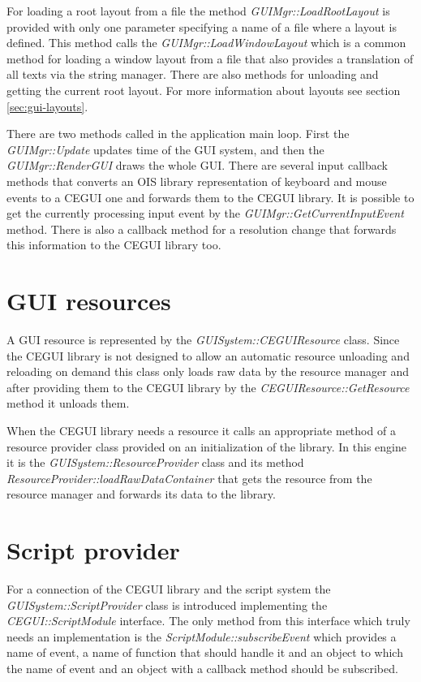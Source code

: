 \documentclass[a4paper, 12pt]{report}
\begin{document}
For loading a root layout from a file the method \emph{GUIMgr::LoadRootLayout} is provided with only one parameter specifying a name of a file where a layout is defined. This method calls the \emph{GUIMgr::LoadWindowLayout} which is a common method for loading a window layout from a file that also provides a translation of all texts via the string manager. There are also methods for unloading and getting the current root layout. For more information about layouts see section \ref{sec:gui-layouts}.

There are two methods called in the application main loop. First the \emph{GUIMgr::Update} updates time of the GUI system, and then the \emph{GUIMgr::Render\-GUI} draws the whole GUI. There are several input callback methods that converts an OIS library representation of keyboard and mouse events to a CEGUI one and forwards them to the CEGUI library. It is possible to get the currently processing input event by the \emph{GUIMgr::GetCurrentInputEvent} method. There is also a callback method for a resolution change that forwards this information to the CEGUI library too.

\section{GUI resources}
\label{sec:gui-resources}

A GUI resource is represented by the \emph{GUISystem::CEGUIResource} class. Since the CEGUI library is not designed to allow an automatic resource unloading and reloading on demand this class only loads raw data by the resource manager and after providing them to the CEGUI library by the \emph{CEGUIResource::GetResource} method it unloads them.

When the CEGUI library needs a resource it calls an appropriate method of a resource provider class provided on an initialization of the library. In this engine it is the \emph{GUISystem::ResourceProvider} class and its method \emph{ResourceProvider::loadRawDataContainer} that gets the resource from the resource manager and forwards its data to the library.

\section{Script provider}
\label{sec:gui-script}

For a connection of the CEGUI library and the script system the \emph{GUISystem::ScriptProvider} class is introduced implementing the \emph{CEGUI::ScriptModule} interface. The only method from this interface which truly needs an implementation is the \emph{ScriptModule::subscribeEvent} which provides a name of event, a name of function that should handle it and an object to which the name of event and an object with a callback method should be subscribed.
\end{document}
